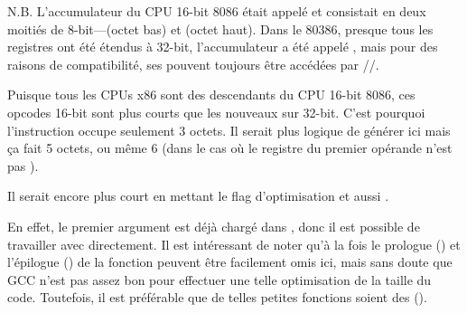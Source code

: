 N.B.  L'accumulateur du CPU 16-bit 8086 était appelé \AX et consistait en deux moitiés
de 8-bit---\AL (octet bas) et \AH (octet haut).
Dans le 80386, presque tous les registres ont été étendus à 32-bit, l'accumulateur
a été appelé \EAX, mais pour des raisons de compatibilité, ses 
pouvent toujours être accédées par \AX/\AH/\AL.

Puisque tous les CPUs x86 sont des descendants du CPU 16-bit 8086, ces 
opcodes 16-bit sont plus courts que les nouveaux sur 32-bit.
C'est pourquoi l'instruction  occupe seulement 3 octets.
Il serait plus logique de générer ici   mais ça fait 5 octets,
ou même 6 (dans le cas où le registre du premier opérande n'est pas \EAX).


Il serait encore plus court en mettant le flag d'optimisation \Othree et aussi .




En effet, le premier argument est déjà chargé dans \EAX, donc il est possible de
travailler avec directement.
Il est intéressant de noter qu'à la fois le prologue ()
et l'épilogue () de la fonction peuvent être facilement omis ici, mais
sans doute que GCC n'est pas assez bon pour effectuer une telle optimisation de la
taille du code.
Toutefois, il est préférable que de telles petites fonctions soient des  ().
